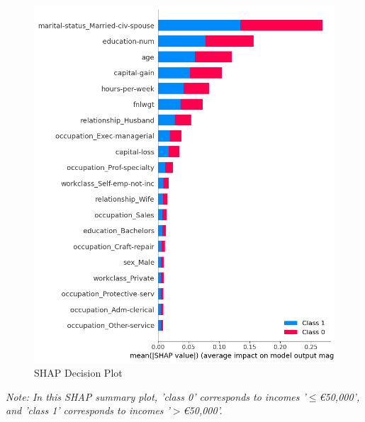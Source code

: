 \documentclass[10pt,journal,compsoc]{IEEEtran}
\begin{document}
\begin{figure}[H]
    \centering
    \includegraphics[width=1\linewidth]{images/shap_summary_plot.png}
    \caption{SHAP Decision Plot}
    \label{fig:shap_explainer}
\end{figure}
\textit{Note: In this SHAP summary plot, 'class 0' corresponds to incomes '$\leq$€50,000', and 'class 1' corresponds to incomes '$>$€50,000'.}
\\
\end{document}
